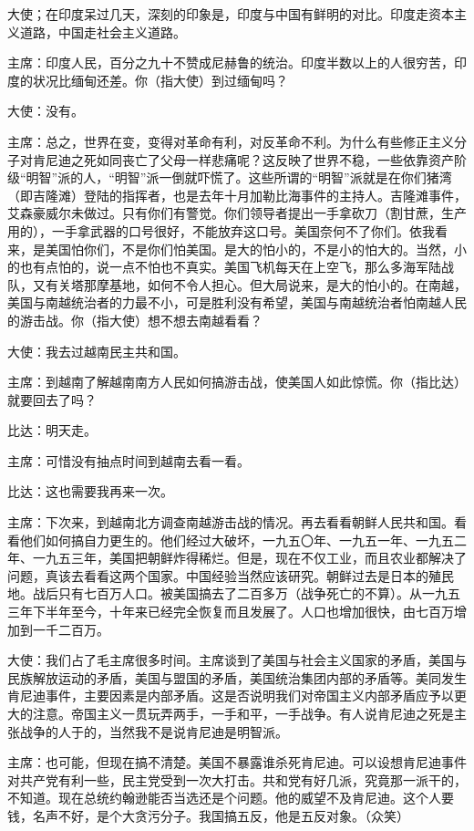 大使；在印度呆过几天，深刻的印象是，印度与中国有鲜明的对比。印度走资本主义道路，中国走社会主义道路。

主席：印度人民，百分之九十不赞成尼赫鲁的统治。印度半数以上的人很穷苦，印度的状况比缅甸还差。你（指大使）到过缅甸吗？

大使：没有。

主席：总之，世界在变，变得对革命有利，对反革命不利。为什么有些修正主义分子对肯尼迪之死如同丧亡了父母一样悲痛呢？这反映了世界不稳，一些依靠资产阶级“明智”派的人，“明智”派一倒就吓慌了。这些所谓的“明智”派就是在你们猪湾（即吉隆滩）登陆的指挥者，也是去年十月加勒比海事件的主持人。吉隆滩事件，艾森豪威尔未做过。只有你们有警觉。你们领导者提出一手拿砍刀（割甘蔗，生产用的），一手拿武器的口号很好，不能放弃这口号。美国奈何不了你们。依我看来，是美国怕你们，不是你们怕美国。是大的怕小的，不是小的怕大的。当然，小的也有点怕的，说一点不怕也不真实。美国飞机每天在上空飞，那么多海军陆战队，又有关塔那摩基地，如何不令人担心。但大局说来，是大的怕小的。在南越，美国与南越统治者的力最不小，可是胜利没有希望，美国与南越统治者怕南越人民的游击战。你（指大使）想不想去南越看看？

大使：我去过越南民主共和国。

主席：到越南了解越南南方人民如何搞游击战，使美国人如此惊慌。你（指比达）就要回去了吗？

比达：明天走。

主席：可惜没有抽点时间到越南去看一看。

比达：这也需要我再来一次。

主席：下次来，到越南北方调查南越游击战的情况。再去看看朝鲜人民共和国。看看他们如何搞自力更生的。他们经过大破坏，一九五〇年、一九五一年、一九五二年、一九五三年，美国把朝鲜炸得稀烂。但是，现在不仅工业，而且农业都解决了问题，真该去看看这两个国家。中国经验当然应该研究。朝鲜过去是日本的殖民地。战后只有七百万人口。被美国搞去了二百多万（战争死亡的不算）。从一九五三年下半年至今，十年来已经完全恢复而且发展了。人口也增加很快，由七百万增加到一千二百万。

大使：我们占了毛主席很多时间。主席谈到了美国与社会主义国家的矛盾，美国与民族解放运动的矛盾，美国与盟国的矛盾，美国统治集团内部的矛盾等。美同发生肯尼迪事件，主要因素是内部矛盾。这是否说明我们对帝国主义内部矛盾应予以更大的注意。帝国主义一贯玩弄两手，一手和平，一手战争。有人说肯尼迪之死是主张战争的人于的，当然我不是说肯尼迪是明智派。

主席：也可能，但现在搞不清楚。美国不暴露谁杀死肯尼迪。可以设想肯尼迪事件对共产党有利一些，民主党受到一次大打击。共和党有好几派，究竟那一派干的，不知道。现在总统约翰逊能否当选还是个问题。他的威望不及肯尼迪。这个人要钱，名声不好，是个大贪污分子。我国搞五反，他是五反对象。（众笑）

